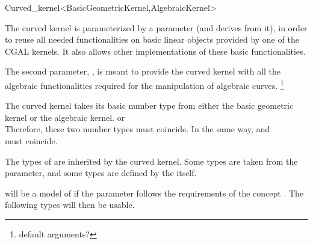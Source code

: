 \begin{ccRefClass}{Curved_kernel<BasicGeometricKernel,AlgebraicKernel>}

\ccDefinition




\ccParameters

The curved kernel is parameterized by a  parameter
(and derives from it), in order to reuse all needed functionalities on
basic linear objects provided by one of the CGAL kernels. It also
allows other implementations of these basic functionalities.

The second parameter, , is meant to provide the
curved kernel with all the algebraic functionalities required for the
manipulation of algebraic curves. 
\footnote{default arguments?}

\ccInheritsFrom


\ccTypes

\ccThreeToTwo

The curved kernel takes its basic number type from either the basic geometric kernel or the algebraic kernel. 
or\\
Therefore, these two number types must coincide. In the same way,
and\\
must coincide. 


The types of  are inherited by the curved kernel.
Some types are taken from the  parameter, and
some types are defined by the  itself.

 will be a model of  if the 
 parameter follows the requirements of the 
concept . The following types will then be usable. 

\ccGlue
{}
\ccGlue
{}


\end{ccRefClass}
